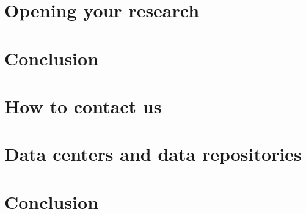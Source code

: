 \documentclass[
]{book}
\begin{document}
\hypertarget{opening-your-research}{%
\chapter{Opening your research}\label{opening-your-research}}

\hypertarget{conclusion}{%
\chapter{Conclusion}\label{conclusion}}

\hypertarget{how-to-contact-us}{%
\chapter{How to contact us}\label{how-to-contact-us}}

\hypertarget{data-centers-and-data-repositories-1}{%
\chapter{Data centers and data repositories}\label{data-centers-and-data-repositories-1}}

\hypertarget{conclusion-1}{%
\chapter{Conclusion}\label{conclusion-1}}

  
\end{document}

